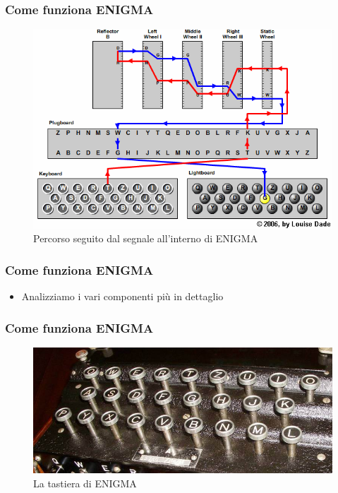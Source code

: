 	\begin{frame}
		\frametitle{Come funziona ENIGMA}
		\begin{figure}[h]
			\centering
			\includegraphics[scale=0.55]{img/wiring}
			\caption{Percorso seguito dal segnale all'interno di ENIGMA}
			\label{fig:wiring}
		\end{figure}
	\end{frame}
	
	\begin{frame}
		\frametitle{Come funziona ENIGMA}
		\begin{itemize}
			\item Analizziamo i vari componenti più in dettaglio
		\end{itemize}
	\end{frame}
	
	\begin{frame}
		\frametitle{Come funziona ENIGMA}
		\begin{figure}
			\centering
			\includegraphics[scale=0.5]{img/keyboard}
			\caption{La tastiera di ENIGMA}
			\label{fig:keyboard}
		\end{figure}
	\end{frame}
	

